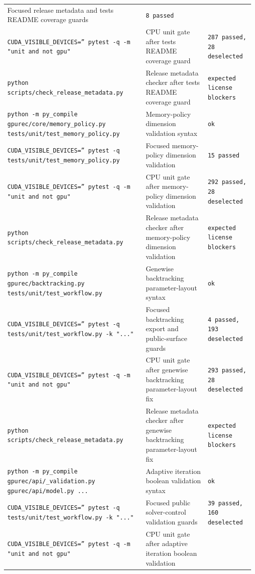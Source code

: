 \documentclass[11pt]{article}
\begin{document}
\begin{center}
\begin{tabular}{lll}
Focused release metadata and tests README coverage guards &
\texttt{8 passed} \\
\texttt{CUDA\_VISIBLE\_DEVICES='' pytest -q -m "unit and not gpu"} &
CPU unit gate after tests README coverage guard &
\texttt{287 passed, 28 deselected} \\
\texttt{python scripts/check\_release\_metadata.py} &
Release metadata checker after tests README coverage guard &
\texttt{expected license blockers} \\
\texttt{python -m py\_compile gpurec/core/memory\_policy.py tests/unit/test\_memory\_policy.py} &
Memory-policy dimension validation syntax &
\texttt{ok} \\
\texttt{CUDA\_VISIBLE\_DEVICES='' pytest -q tests/unit/test\_memory\_policy.py} &
Focused memory-policy dimension validation &
\texttt{15 passed} \\
\texttt{CUDA\_VISIBLE\_DEVICES='' pytest -q -m "unit and not gpu"} &
CPU unit gate after memory-policy dimension validation &
\texttt{292 passed, 28 deselected} \\
\texttt{python scripts/check\_release\_metadata.py} &
Release metadata checker after memory-policy dimension validation &
\texttt{expected license blockers} \\
\texttt{python -m py\_compile gpurec/backtracking.py tests/unit/test\_workflow.py} &
Genewise backtracking parameter-layout syntax &
\texttt{ok} \\
\texttt{CUDA\_VISIBLE\_DEVICES='' pytest -q tests/unit/test\_workflow.py -k "..."} &
Focused backtracking export and public-surface guards &
\texttt{4 passed, 193 deselected} \\
\texttt{CUDA\_VISIBLE\_DEVICES='' pytest -q -m "unit and not gpu"} &
CPU unit gate after genewise backtracking parameter-layout fix &
\texttt{293 passed, 28 deselected} \\
\texttt{python scripts/check\_release\_metadata.py} &
Release metadata checker after genewise backtracking parameter-layout fix &
\texttt{expected license blockers} \\
\texttt{python -m py\_compile gpurec/api/\_validation.py gpurec/api/model.py ...} &
Adaptive iteration boolean validation syntax &
\texttt{ok} \\
\texttt{CUDA\_VISIBLE\_DEVICES='' pytest -q tests/unit/test\_workflow.py -k "..."} &
Focused public solver-control validation guards &
\texttt{39 passed, 160 deselected} \\
\texttt{CUDA\_VISIBLE\_DEVICES='' pytest -q -m "unit and not gpu"} &
CPU unit gate after adaptive iteration boolean validation &

\end{tabular}
\end{center}
\end{document}
